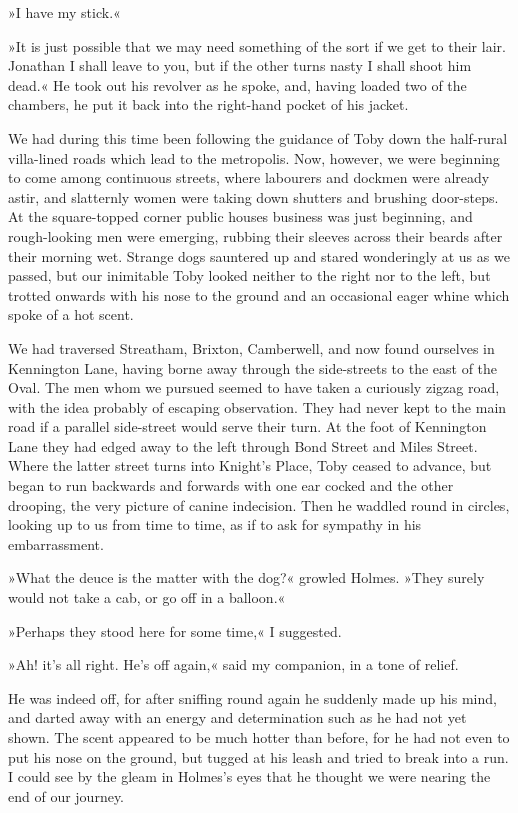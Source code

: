 »I have my stick.«

»It is just possible that we may need something of the sort if we get to their lair. Jonathan I shall leave to you, but if the other turns nasty I shall shoot him dead.« He took out his revolver as he spoke, and, having loaded two of the chambers, he put it back into the right-hand pocket of his jacket.

We had during this time been following the guidance of Toby down the half-rural villa-lined roads which lead to the metropolis. Now, however, we were beginning to come among continuous streets, where labourers and dockmen were already astir, and slatternly women were taking down shutters and brushing door-steps. At the square-topped corner public houses business was just beginning, and rough-looking men were emerging, rubbing their sleeves across their beards after their morning wet. Strange dogs sauntered up and stared wonderingly at us as we passed, but our inimitable Toby looked neither to the right nor to the left, but trotted onwards with his nose to the ground and an occasional eager whine which spoke of a hot scent.

We had traversed Streatham, Brixton, Camberwell, and now found ourselves in Kennington Lane, having borne away through the side-streets to the east of the Oval. The men whom we pursued seemed to have taken a curiously zigzag road, with the idea probably of escaping observation. They had never kept to the main road if a parallel side-street would serve their turn. At the foot of Kennington Lane they had edged away to the left through Bond Street and Miles Street. Where the latter street turns into Knight's Place, Toby ceased to advance, but began to run backwards and forwards with one ear cocked and the other drooping, the very picture of canine indecision. Then he waddled round in circles, looking up to us from time to time, as if to ask for sympathy in his embarrassment.

»What the deuce is the matter with the dog?« growled Holmes. »They surely would not take a cab, or go off in a balloon.«

»Perhaps they stood here for some time,« I suggested.

»Ah! it's all right. He's off again,« said my companion, in a tone of relief.

He was indeed off, for after sniffing round again he suddenly made up his mind, and darted away with an energy and determination such as he had not yet shown. The scent appeared to be much hotter than before, for he had not even to put his nose on the ground, but tugged at his leash and tried to break into a run. I could see by the gleam in Holmes's eyes that he thought we were nearing the end of our journey.

